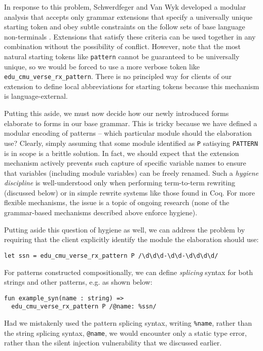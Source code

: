 In response to this problem, Schwerdfeger and Van Wyk developed a modular analysis that accepts only grammar extensions that specify a universally unique starting token and obey subtle constraints on  the follow sets of base language non-terminals \cite{conf/pldi/SchwerdfegerW09}. Extensions that satisfy these criteria can be used together in any combination without the possibility of conflict. However, note that the most natural starting tokens like \lstinline{pattern} cannot be guaranteed to be universally unique, so we would be forced to use a more verbose token like \lstinline{edu_cmu_verse_rx_pattern}. There is no principled way for clients of our extension to define local abbreviations for starting tokens because this mechanism is language-external.

Putting this aside, we must now decide how our newly introduced forms elaborate to forms in our base grammar. This is tricky because we have defined a modular encoding of patterns -- which particular module should the elaboration use? Clearly, simply assuming that some module identified as \lstinline{P} satisying \lstinline{PATTERN} is in scope is a brittle solution. In fact, we should expect that the extension mechanism actively prevents such capture of specific variable names to ensure that variables (including module variables) can be freely renamed. Such a \emph{hygiene discipline} is well-understood only when performing term-to-term rewriting (discussed below) or in simple rewrite systems like those found in Coq. For more flexible mechanisms, the issue is a topic of ongoing research (none of the grammar-based mechanisms described above enforce hygiene).

Putting aside this question of hygiene as well, we can address the problem by requiring that the client explicitly identify the module the elaboration should use:
\begin{lstlisting}[numbers=none]
let ssn = edu_cmu_verse_rx_pattern P /\d\d\d-\d\d-\d\d\d\d/
\end{lstlisting}
For patterns constructed compositionally, we can define \emph{splicing} syntax for both strings and other patterns, e.g. as shown below:
\begin{lstlisting}[numbers=none,escapechar=|]
fun example_syn(name : string) => 
  edu_cmu_verse_rx_pattern P /@name: %ssn/
\end{lstlisting}
Had we mistakenly used the pattern splicing syntax, writing \lstinline{%name}, rather than the string splicing syntax, \lstinline{@name}, we would encounter only a static type error, rather than the  silent injection  vulnerability that we discussed earlier.

